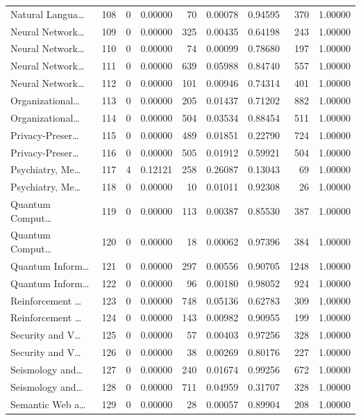 \begin{table}
\begin{tabular}{lrrrrrrrr}
Natural Langua… & 108 & 0 & 0.00000 & 70 & 0.00078 & 0.94595 & 370 & 1.00000 \\
Neural Network… & 109 & 0 & 0.00000 & 325 & 0.00435 & 0.64198 & 243 & 1.00000 \\
Neural Network… & 110 & 0 & 0.00000 & 74 & 0.00099 & 0.78680 & 197 & 1.00000 \\
Neural Network… & 111 & 0 & 0.00000 & 639 & 0.05988 & 0.84740 & 557 & 1.00000 \\
Neural Network… & 112 & 0 & 0.00000 & 101 & 0.00946 & 0.74314 & 401 & 1.00000 \\
Organizational… & 113 & 0 & 0.00000 & 205 & 0.01437 & 0.71202 & 882 & 1.00000 \\
Organizational… & 114 & 0 & 0.00000 & 504 & 0.03534 & 0.88454 & 511 & 1.00000 \\
Privacy-Preser… & 115 & 0 & 0.00000 & 489 & 0.01851 & 0.22790 & 724 & 1.00000 \\
Privacy-Preser… & 116 & 0 & 0.00000 & 505 & 0.01912 & 0.59921 & 504 & 1.00000 \\
Psychiatry, Me… & 117 & 4 & 0.12121 & 258 & 0.26087 & 0.13043 & 69 & 1.00000 \\
Psychiatry, Me… & 118 & 0 & 0.00000 & 10 & 0.01011 & 0.92308 & 26 & 1.00000 \\
Quantum Comput… & 119 & 0 & 0.00000 & 113 & 0.00387 & 0.85530 & 387 & 1.00000 \\
Quantum Comput… & 120 & 0 & 0.00000 & 18 & 0.00062 & 0.97396 & 384 & 1.00000 \\
Quantum Inform… & 121 & 0 & 0.00000 & 297 & 0.00556 & 0.90705 & 1248 & 1.00000 \\
Quantum Inform… & 122 & 0 & 0.00000 & 96 & 0.00180 & 0.98052 & 924 & 1.00000 \\
Reinforcement … & 123 & 0 & 0.00000 & 748 & 0.05136 & 0.62783 & 309 & 1.00000 \\
Reinforcement … & 124 & 0 & 0.00000 & 143 & 0.00982 & 0.90955 & 199 & 1.00000 \\
Security and V… & 125 & 0 & 0.00000 & 57 & 0.00403 & 0.97256 & 328 & 1.00000 \\
Security and V… & 126 & 0 & 0.00000 & 38 & 0.00269 & 0.80176 & 227 & 1.00000 \\
Seismology and… & 127 & 0 & 0.00000 & 240 & 0.01674 & 0.99256 & 672 & 1.00000 \\
Seismology and… & 128 & 0 & 0.00000 & 711 & 0.04959 & 0.31707 & 328 & 1.00000 \\
Semantic Web a… & 129 & 0 & 0.00000 & 28 & 0.00057 & 0.89904 & 208 & 1.00000 \\

\end{tabular}
\end{table}
